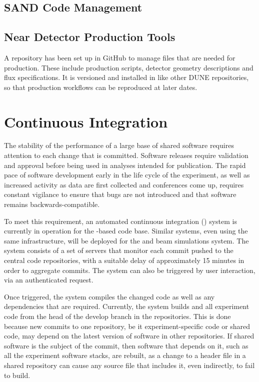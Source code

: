 \documentclass[../main-v1.tex]{subfiles}
\begin{document}
\subsection{SAND Code Management}
\label{sec:codemgmt:sand}

\subsection{Near Detector Production Tools}
\label{sec:codemgmt:ndproduction}

A repository has been set up in GitHub to manage files that are needed for  production.  These include production scripts, detector geometry descriptions and flux specifications.  It is versioned and installed in  like other DUNE repositories, so that production workflows can be reproduced at later dates.

\section{Continuous Integration }
\label{sec:codemgmt:ci}

The stability of the performance of a large base of shared software requires attention to each change that is committed.  Software releases require validation and approval before being used in analyses intended for publication.  The rapid pace of software development early in the life cycle of the experiment, as well as increased activity as data are first collected and conferences come up, requires constant vigilance to ensure that bugs are not introduced and that software remains backwards-compatible.

To meet this requirement, an automated continuous integration () system is currently in operation for the -based code base.  Similar systems, even using the same infrastructure, will be deployed for the  and beam simulations system.  The  system consists of a set of servers that monitor %
each commit pushed to the central code repositories, with a suitable delay of approximately 15 minutes in order to aggregate commits. The  system can also be triggered by user interaction, via an authenticated request.

Once triggered, the  system  compiles the changed code as well as any dependencies that are required.  Currently, the  system builds  and all experiment code from the head of the develop branch in the repositories.  This is done because new commits to one repository, be it experiment-specific code or shared  code, may depend on the latest version of software in other repositories.  If shared software is the subject of the commit, then software that depends on it, such as all the experiment software stacks, are rebuilt, as a change to a header file in a shared repository can cause any source file that includes it, even indirectly, to fail to build.
\end{document}
